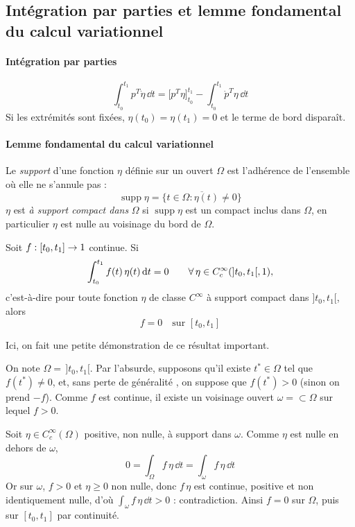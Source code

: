 \subsection{Intégration par parties et lemme fondamental du calcul variationnel}

\paragraph{Intégration par parties}

\[
    \int_{t_0}^{t_1} p^T\dot\eta\,\dd t
    = \bigl[p^T\eta\bigr]_{t_0}^{t_1}
    - \int_{t_0}^{t_1} \dot p^T\eta\,\dd t
\]
Si les extrémités sont fixées, $\eta(t_0) = \eta(t_1) = 0$ et le
terme de bord disparaît.

\paragraph{Lemme fondamental du calcul variationnel}

\begin{definition}[Support]
    Le \emph{support} d'une fonction $\eta$ définie sur un ouvert
    $\Omega$ est l'adhérence de l'ensemble où elle ne s'annule pas :
    \[
        \operatorname{supp}\eta
        = \overline{\{t\in\Omega : \eta(t)\neq 0\}}
    \]
    $\eta$ est \emph{à support compact dans} $\Omega$ si
    $\operatorname{supp}\eta$ est un compact inclus dans $\Omega$,
    en particulier $\eta$ est nulle au voisinage du bord de $\Omega$.
\end{definition}

\begin{lemme}
    Soit $f : [t_0,t_1]\to1$ continue. Si
    \[
        \int_{t_0}^{t_1} f(t)\,\eta(t)\,\mathrm{d} t = 0
        \qquad \forall\,\eta\in C_c^\infty(]t_0,t_1[,1),
    \]
    c'est-à-dire pour toute fonction $\eta$ de classe $C^\infty$ 
    à support compact dans $]t_0,t_1[$, alors
    \[
        f = 0 \quad \text{sur } [t_0,t_1]
    \]
\end{lemme}
Ici, on fait une petite démonstration de ce résultat important.
\begin{demonstration}
    On note $\Omega = \,]t_0,t_1[$. Par l'absurde, supposons qu'il
    existe $t^*\in\Omega$ tel que $f(t^*)\neq 0$, et, sans perte de généralité
    , on suppose que $f(t^*) > 0$ (sinon on prend $-f$). Comme $f$ est continue, il existe un
    voisinage ouvert $\omega = \subset\Omega$ sur lequel
    $f > 0$.

    Soit $\eta\in C_c^\infty(\Omega)$ positive, non nulle, à support dans
    $\omega$. Comme $\eta$ est nulle en dehors de $\omega$,
    \[
        0 = \int_\Omega f\,\eta\,\dd t = \int_\omega f\,\eta\,\dd t
    \]
    Or sur $\omega$, $f > 0$ et $\eta\geq 0$ non nulle, donc
    $f\,\eta$ est continue, positive et non identiquement nulle, d'où
    $\int_\omega f\,\eta\,\dd t > 0$ :
    contradiction. Ainsi $f = 0$ sur $\Omega$, puis sur $[t_0,t_1]$ par
    continuité.
\end{demonstration}

